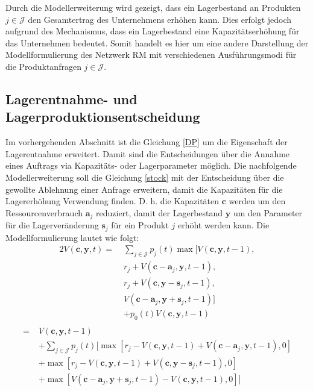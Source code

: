 Durch die Modellerweiterung wird gezeigt, dass ein Lagerbestand an Produkten $j\in\mathcal{J}$ den Gesamtertrag des Unternehmens erhöhen kann. Dies erfolgt jedoch aufgrund des Mechanismus, dass ein Lagerbestand eine Kapazitätserhöhung für das Unternehmen bedeutet. Somit handelt es hier um eine andere Darstellung der Modellformulierung des Netzwerk RM mit verschiedenen Ausführungsmodi für die Produktanfragen $j\in\mathcal{J}$. %

\subsection{Lagerentnahme- und Lagerproduktionsentscheidung}

Im vorhergehenden Abschnitt ist die Gleichung \eqref{DP} um die Eigenschaft der Lagerentnahme erweitert. Damit sind die Entscheidungen über die Annahme eines Auftrags via Kapazitäts- oder Lagerparameter möglich. Die nachfolgende Modellerweiterung soll die Gleichung \eqref{stock} mit der Entscheidung über die gewollte Ablehnung einer Anfrage erweitern, damit die Kapazitäten für die Lagererhöhung Verwendung finden. D. h. die Kapazitäten $\textbf{c}$ werden um den Ressourcenverbrauch $\textbf{a}_{j}$ reduziert, damit der Lagerbestand $\textbf{y}$ um den Parameter für die Lagerveränderung $\textbf{s}_{j}$ für ein Produkt $j$ erhöht werden kann. Die Modellformulierung lautet wie folgt:
\begin{alignat*}{2}
V(\textbf{c}, \textbf{y}, t) =\;& \sum_{j \in \mathcal{J}}p_{j}(t)\max[V(\textbf{c}, \textbf{y}, t-1),\\
&r_{j} + V(\textbf{c}-\textbf{a}_j, \textbf{y}, t-1),\\
&r_{j} + V(\textbf{c}, \textbf{y}-\textbf{s}_j, t-1),\\
&V(\textbf{c}-\textbf{a}_j, \textbf{y}+\textbf{s}_j, t-1)]\\
&+ p_{0}(t)V(\textbf{c}, \textbf{y}, t-1) \\
\end{alignat*}
\begin{equation}\label{storage}
\begin{alignat*}{2}
= \;& V(\textbf{c}, \textbf{y}, t-1)\\
&+ \sum_{j \in \mathcal{J}}p_{j}(t)[\max[r_{j} - V(\textbf{c}, \textbf{y}, t-1) + V(\textbf{c}-\textbf{a}_j, \textbf{y}, t-1),0] \\
&+ \max[r_{j} - V(\textbf{c}, \textbf{y}, t-1) + V(\textbf{c}, \textbf{y}-\textbf{s}_j, t-1),0]\\
&+ \max[V(\textbf{c}-\textbf{a}_j, \textbf{y}+\textbf{s}_j, t-1) - V(\textbf{c}, \textbf{y}, t-1) ,0]]\\
\end{alignat*}
\end{equation}

